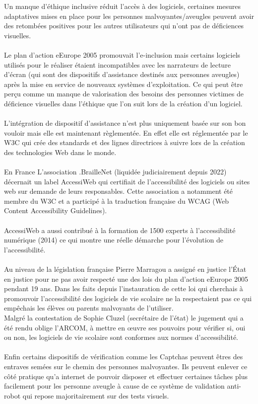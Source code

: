 \documentclass{article}
\begin{document}
Un manque d’éthique inclusive réduit l’accès à des logiciels, certaines mesures adaptatives mises en place pour les personnes malvoyantes/aveugles peuvent avoir des retombées positives pour les autres utilisateurs qui n’ont pas de déficiences visuelles. \\ \\
Le plan d’action eEurope 2005 promouvait l’e-inclusion mais certains logiciels utilisés pour le réaliser étaient incompatibles avec les narrateurs de lecture d'écran (qui sont des dispositifs d’assistance destinés aux personnes aveugles) après la mise en service de nouveaux systèmes d'exploitation. Ce qui peut être perçu comme un manque de valorisation des besoins des personnes victimes de déficience visuelles dans l’éthique que l’on suit lors de la création d’un logiciel. 
\\\\
L’intégration de dispositif d’assistance n’est plus uniquement basée sur son bon vouloir mais elle est maintenant règlementée. En effet elle est réglementée par le W3C qui crée des standards et des lignes directrices à suivre lors de la création des technologies Web dans le monde. 
\\\\
En France L’association \cite{Wikipedia}.BrailleNet (liquidée judiciairement depuis 2022) décernait un label AccessiWeb qui certifiait de l’accessibilité des logiciels ou sites web sur demande de leurs responsables. Cette association a notamment été membre du W3C et a participé à la traduction française du WCAG (Web Content Accessibility Guidelines). 
\\\\
AccessiWeb a aussi contribué à la formation de 1500 experts à l’accessibilité numérique (2014) ce qui montre une réelle démarche pour l’évolution de l’accessibilité. 
\\\\
\cite{Gourvennec_2024}Au niveau de la législation française Pierre Marragou a assigné en justice l’État en justice pour ne pas avoir respecté une des lois du plan d’action eEurope 2005 pendant 19 ans. Dans les faits depuis l’instauration de cette loi qui cherchais à promouvoir l’accessibilité des logiciels de vie scolaire ne la respectaient pas ce qui empêchais les élèves ou parents malvoyants de l’utiliser. \\ Malgré la contestation de Sophie Cluzel (secrétaire de l’état) le jugement qui a été rendu oblige l’ARCOM, à mettre en œuvre ses pouvoirs pour vérifier si, oui ou non, les logiciels de vie scolaire sont conformes aux normes d’accessibilité. \\\\ 
Enfin certains dispositifs de vérification comme les Captchas \cite{Wagner_2022b} peuvent êtres des entraves semées sur le chemin des personnes malvoyantes. Ils peuvent enlever ce côté pratique qu’a internet de pouvoir disposer et effectuer certaines tâches plus facilement pour les personne aveugle à cause de ce système de validation anti-robot qui repose majoritairement sur des tests visuels. \\\\
\end{document}
